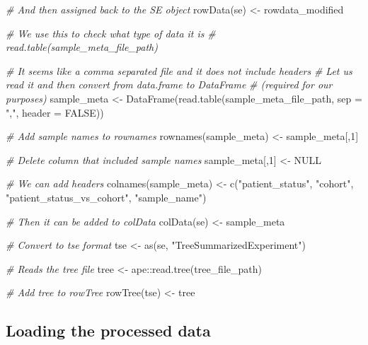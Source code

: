 \documentclass[
  oneside]{book}
\newenvironment{Shaded}{\begin{snugshade}}{\end{snugshade}}
\newcommand{\AttributeTok}[1]{\textcolor[rgb]{0.77,0.63,0.00}{#1}}
\newcommand{\CommentTok}[1]{\textcolor[rgb]{0.56,0.35,0.01}{\textit{#1}}}
\newcommand{\ConstantTok}[1]{\textcolor[rgb]{0.00,0.00,0.00}{#1}}
\newcommand{\DecValTok}[1]{\textcolor[rgb]{0.00,0.00,0.81}{#1}}
\newcommand{\FunctionTok}[1]{\textcolor[rgb]{0.00,0.00,0.00}{#1}}
\newcommand{\NormalTok}[1]{#1}
\newcommand{\OtherTok}[1]{\textcolor[rgb]{0.56,0.35,0.01}{#1}}
\newcommand{\SpecialCharTok}[1]{\textcolor[rgb]{0.00,0.00,0.00}{#1}}
\newcommand{\StringTok}[1]{\textcolor[rgb]{0.31,0.60,0.02}{#1}}
\begin{document}
\begin{Shaded}
\begin{Highlighting}[]
\CommentTok{\# And then assigned back to the SE object}
\FunctionTok{rowData}\NormalTok{(se) }\OtherTok{\textless{}{-}}\NormalTok{ rowdata\_modified}


\CommentTok{\# We use this to check what type of data it is}
\CommentTok{\# read.table(sample\_meta\_file\_path)}

\CommentTok{\# It seems like a comma separated file and it does not include headers}
\CommentTok{\# Let us read it and then convert from data.frame to DataFrame}
\CommentTok{\# (required for our purposes)}
\NormalTok{sample\_meta }\OtherTok{\textless{}{-}} \FunctionTok{DataFrame}\NormalTok{(}\FunctionTok{read.table}\NormalTok{(sample\_meta\_file\_path, }\AttributeTok{sep =} \StringTok{","}\NormalTok{, }\AttributeTok{header =} \ConstantTok{FALSE}\NormalTok{))}

\CommentTok{\# Add sample names to rownames}
\FunctionTok{rownames}\NormalTok{(sample\_meta) }\OtherTok{\textless{}{-}}\NormalTok{ sample\_meta[,}\DecValTok{1}\NormalTok{]}

\CommentTok{\# Delete column that included sample names}
\NormalTok{sample\_meta[,}\DecValTok{1}\NormalTok{] }\OtherTok{\textless{}{-}} \ConstantTok{NULL}

\CommentTok{\# We can add headers}
\FunctionTok{colnames}\NormalTok{(sample\_meta) }\OtherTok{\textless{}{-}} \FunctionTok{c}\NormalTok{(}\StringTok{"patient\_status"}\NormalTok{, }\StringTok{"cohort"}\NormalTok{, }\StringTok{"patient\_status\_vs\_cohort"}\NormalTok{, }\StringTok{"sample\_name"}\NormalTok{)}

\CommentTok{\# Then it can be added to colData}
\FunctionTok{colData}\NormalTok{(se) }\OtherTok{\textless{}{-}}\NormalTok{ sample\_meta}

\CommentTok{\# Convert to tse format}
\NormalTok{tse }\OtherTok{\textless{}{-}} \FunctionTok{as}\NormalTok{(se, }\StringTok{"TreeSummarizedExperiment"}\NormalTok{)}

\CommentTok{\# Reads the tree file}
\NormalTok{tree }\OtherTok{\textless{}{-}}\NormalTok{ ape}\SpecialCharTok{::}\FunctionTok{read.tree}\NormalTok{(tree\_file\_path)}

\CommentTok{\# Add tree to rowTree}
\FunctionTok{rowTree}\NormalTok{(tse) }\OtherTok{\textless{}{-}}\NormalTok{ tree}
\end{Highlighting}
\end{Shaded}

\hypertarget{loading-the-processed-data}{%
\subsection{Loading the processed data}\label{loading-the-processed-data}}
\end{document}
